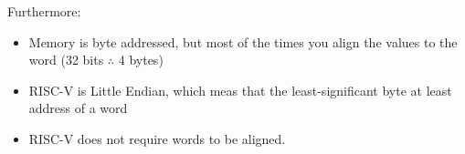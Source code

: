 \documentclass{article}
\begin{document}
Furthermore:
\begin{itemize}
    \item Memory is byte addressed, but most of the times you align the values to the word (32 bits $\therefore$ 4 bytes)
    \item RISC-V is Little Endian, which meas that the least-significant byte at least address of a word
    \item RISC-V does not require words to be aligned.
\end{itemize}
\end{document}
